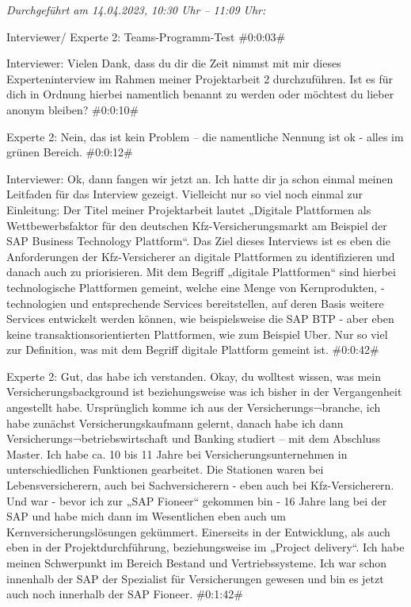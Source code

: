 \textit{Durchgeführt am 14.04.2023, 10:30 Uhr -- 11:09 Uhr:}

Interviewer/ Experte 2:
Teams-Programm-Test 
\#0:0:03\#

Interviewer:
Vielen Dank, dass du dir die Zeit nimmst mit mir dieses Experteninterview im Rahmen meiner Projektarbeit 2 durchzuführen. Ist es für dich in Ordnung hierbei namentlich benannt zu werden oder möchtest du lieber anonym bleiben?
\#0:0:10\#

Experte 2:
Nein, das ist kein Problem – die namentliche Nennung ist ok - alles im grünen Bereich.
\#0:0:12\#

Interviewer:
Ok, dann fangen wir jetzt an. Ich hatte dir ja schon einmal meinen Leitfaden für das Interview gezeigt. Vielleicht nur so viel noch einmal zur Einleitung: Der Titel meiner Projektarbeit lautet „Digitale Plattformen als Wettbewerbsfaktor für den deutschen Kfz-Versicherungsmarkt am Beispiel der SAP Business Technology Plattform“. Das Ziel dieses Interviews ist es eben die Anforderungen der Kfz-Versicherer an digitale Plattformen zu identifizieren und danach auch zu priorisieren. Mit dem Begriff „digitale Plattformen“ sind hierbei technologische Plattformen gemeint, welche eine Menge von Kernprodukten, -technologien und entsprechende Services bereitstellen, auf deren Basis weitere Services entwickelt werden können, wie beispielsweise die SAP BTP - aber eben keine transaktionsorientierten Plattformen, wie zum Beispiel Uber. Nur so viel zur Definition, was mit dem Begriff digitale Plattform gemeint ist.
\#0:0:42\#

Experte 2:
Gut, das habe ich verstanden. Okay, du wolltest wissen, was mein Versicherungsbackground ist beziehungsweise was ich bisher in der Vergangenheit angestellt habe. Ursprünglich komme ich aus der Versicherungs¬branche, ich habe zunächst Versicherungskaufmann gelernt, danach habe ich dann Versicherungs¬betriebswirtschaft und Banking studiert – mit dem Abschluss Master. Ich habe ca. 10 bis 11 Jahre bei Versicherungsunternehmen in unterschiedlichen Funktionen gearbeitet. Die Stationen waren bei Lebensversicherern, auch bei Sachversicherern - eben auch bei Kfz-Versicherern. Und war - bevor ich zur „SAP Fioneer“ gekommen bin - 16 Jahre lang bei der SAP und habe mich dann im Wesentlichen eben auch um Kernversicherungslösungen gekümmert. Einerseits in der Entwicklung, als auch eben in der Projektdurchführung, beziehungsweise im „Project delivery“. Ich habe meinen Schwerpunkt im Bereich Bestand und Vertriebssysteme. Ich war schon innenhalb der SAP der Spezialist für Versicherungen gewesen und bin es jetzt auch noch innerhalb der SAP Fioneer.
\#0:1:42\#

